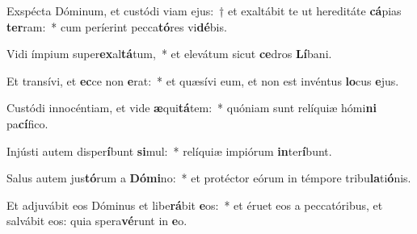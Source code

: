\item Exspécta Dóminum, et custódi viam ejus:~† et exaltábit te ut hereditáte \textbf{cá}pias \textbf{ter}ram:~* cum períerint pecca\textbf{tó}res vi\textbf{dé}bis.
\item Vidi ímpium super\textbf{ex}al\textbf{tá}tum,~* et elevátum sicut \textbf{ce}dros \textbf{Lí}bani.
\item Et transívi, et \textbf{ec}ce non \textbf{e}rat:~* et quæsívi eum, et non est invéntus \textbf{lo}cus \textbf{e}jus.
\item Custódi innocéntiam, et vide \textbf{æ}qui\textbf{tá}tem:~* quóniam sunt relíquiæ hómi\textbf{ni} pa\textbf{cí}fico.
\item Injústi autem disper\textbf{í}bunt \textbf{si}mul:~* relíquiæ impiórum \textbf{in}ter\textbf{í}bunt.
\item Salus autem jus\textbf{tó}rum a \textbf{Dó}\textbf{mi}no:~* et protéctor eórum in témpore tribu\textbf{la}ti\textbf{ó}nis.
\item Et adjuvábit eos Dóminus et libe\textbf{rá}bit \textbf{e}os:~* et éruet eos a peccatóribus, et salvábit eos: quia spera\textbf{vé}runt in \textbf{e}o.
